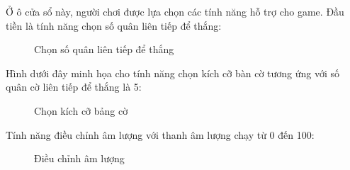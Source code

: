 Ở ô cửa sổ này, người chơi được lựa chọn các tính năng hỗ trợ cho game. Đầu tiền là tính năng chọn số quân liên tiếp để thắng:\\
\begin{figure}[H]
\caption{Chọn số quân liên tiếp để thắng}
\end{figure}
Hình dưới đây minh họa cho tính năng chọn kích cỡ bàn cờ tương ứng với số quân cờ liên tiếp để thắng là 5:\\
\begin{figure}[H]
\caption{Chọn kích cỡ bảng cờ}
\end{figure}
Tính năng điều chỉnh âm lượng với thanh âm lượng chạy từ 0 đến 100:\\
\begin{figure}[H]
\caption{Điều chỉnh âm lượng}
\end{figure}
